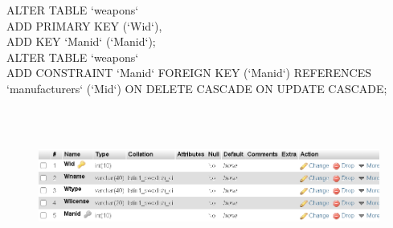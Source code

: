 \documentclass[12pt,a4paper]{report}
\begin{document}
ALTER TABLE `weapons`\\
  ADD PRIMARY KEY (`Wid`),\\
  ADD KEY `Manid` (`Manid`);\\
  ALTER TABLE `weapons`\\
  ADD CONSTRAINT `Manid` FOREIGN KEY (`Manid`) REFERENCES `manufacturers` (`Mid`) ON DELETE CASCADE ON UPDATE CASCADE;
\begin{figure}[hbtp]
\centering
\includegraphics[width=6.0in,height=2in]{../fig/Weapons}\\
\end{figure}\\
\newpage
\end{document}
